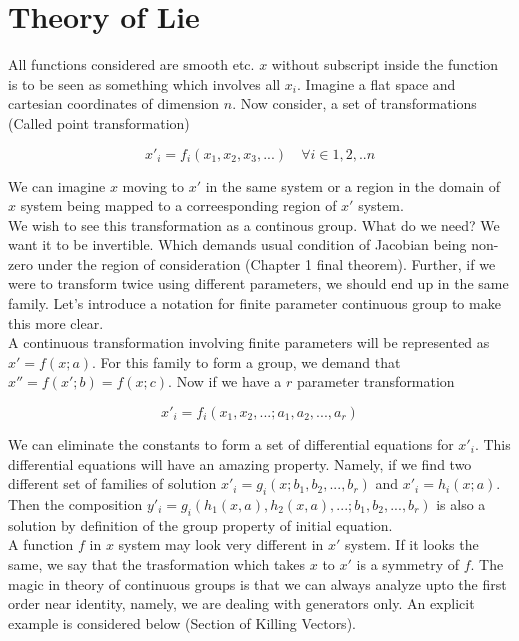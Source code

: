 \documentclass{report}
\begin{document}
\chapter{Theory of Lie}

All functions considered are smooth etc. $x$ without subscript inside the function is to be seen as something which involves all $x_i$. Imagine a flat space and cartesian coordinates of dimension $n$. Now consider, a set of transformations (Called point transformation)

$$x'_i = f_i(x_1, x_2, x_3, ...) \quad \forall i \in {1,2,..n}$$

\noindent We can imagine $x$ moving to $x'$ in the same system or a region in the domain of $x$ system being mapped to a correesponding region of $x'$ system.\\

\noindent We wish to see this transformation as a continous group. What do we need? We want it to be invertible. Which demands usual condition of Jacobian being non-zero under the region of consideration (Chapter 1 final theorem). Further, if we were to transform twice using different parameters, we should end up in the same family. Let's introduce a notation for finite parameter continuous group to make this more clear. \\

\noindent A continuous transformation involving finite parameters will be represented as $x' = f(x;a)$. For this family to form a group, we demand that $x'' = f(x'; b) = f(x;c)$. Now if we have a $r$ parameter transformation 

$$x'_i = f_i(x_1,x_2,...; a_1,a_2,...,a_r)$$

\noindent We can eliminate the constants to form a set of differential equations for $x'_i$. This differential equations will have an amazing property. Namely, if we find two different set of families of solution $x'_i = g_i(x;b_1,b_2,...,b_r)$ and $x'_i = h_i(x;a)$. Then the composition $y'_i = g_i(h_1(x,a), h_2(x,a),...;b_1,b_2,...,b_r)$ is also a solution by definition of the group property of initial equation.\\

\noindent A function $f$ in $x$ system may look very different in $x'$ system. If it looks the same, we say that the trasformation which takes $x$ to $x'$ is a symmetry of $f$. The magic in theory of continuous groups is that we can always analyze upto the first order near identity, namely, we are dealing with generators only. An explicit example is considered below (Section of Killing Vectors).\\
\end{document}
